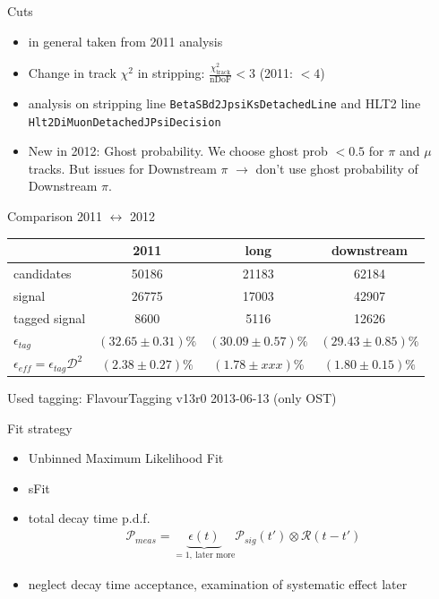 \documentclass{beamer}
\begin{document}
	
	\begin{frame}{Cuts}
    \begin{itemize}
    \item in general taken from 2011 analysis
    \item Change in track $\chi^2$ in stripping: $\frac{\chi^2_{\text{track}}}{\text{nDoF}} < 3$ (2011: $<4$)
    \item analysis on stripping line \texttt{BetaSBd2JpsiKsDetachedLine} and HLT2 line \texttt{Hlt2DiMuonDetachedJPsiDecision}
	\item New in 2012: Ghost probability. We choose ghost prob $<0.5$ for $\pi$ and $\mu$ tracks. But issues for Downstream $\pi$ $\rightarrow$ don't use ghost probability of Downstream $\pi$.
	\end{itemize}
	\end{frame}
	
	\begin{frame}{Comparison 2011 $\leftrightarrow$ 2012}
	\begin{center}
	\begin{tabular}{l c c c}
	\hline \hline 
	 & 2011 & long & downstream \\ \hline
	 candidates & 50186 & 21183 & 62184 \\
	 signal & 26775 & 17003 & 42907 \\
	 tagged signal & 8600 & 5116 & 12626 \\ 
	 $\epsilon_{tag}$ & $(32.65 \pm 0.31)\%$ &$(30.09\pm 0.57)\%$ & $(29.43\pm 0.85)\%$ \\
	 $\epsilon_{eff}= \epsilon_{tag}\mathcal{D}^2$ & $(2.38 \pm 0.27)\%$ & $(1.78 \pm xxx)\%$ & $(1.80\pm 0.15)\%$ \\ \hline \hline
	\end{tabular}
	\end{center}
	\vspace{0.5cm}
	Used tagging: FlavourTagging v13r0 2013-06-13 (only OST)
	\end{frame}
	
	\begin{frame}{Fit strategy}
	\begin{itemize}
	\item Unbinned Maximum Likelihood Fit
	\item sFit
	\item total decay time p.d.f.
	\begin{align}
	\mathcal{P}_{meas} = \underbrace{\epsilon(t)}_{= 1,\ \text{later more}}\mathcal{P}_{sig}(t') \otimes \mathcal{R}(t-t')
	\end{align}
	\item neglect decay time acceptance, examination of systematic effect later
	\end{itemize}
	\end{frame}
	
\end{document}
